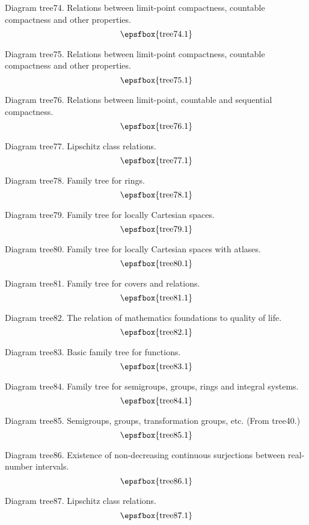 Diagram tree74. Relations between limit-point compactness, countable compactness
and other properties.
$$
\centerline{\epsfbox{tree74.1}}
$$

Diagram tree75. Relations between limit-point compactness, countable compactness
and other properties.
$$
\centerline{\epsfbox{tree75.1}}
$$

\filleject

Diagram tree76. Relations between limit-point, countable and sequential
compactness.
$$
\centerline{\epsfbox{tree76.1}}
$$

Diagram tree77. Lipschitz class relations.
$$
\centerline{\epsfbox{tree77.1}}
$$

Diagram tree78. Family tree for rings.
$$
\centerline{\epsfbox{tree78.1}}
$$

\filleject

Diagram tree79. Family tree for locally Cartesian spaces.
$$
\centerline{\epsfbox{tree79.1}}
$$

Diagram tree80. Family tree for locally Cartesian spaces with atlases.
$$
\centerline{\epsfbox{tree80.1}}
$$

Diagram tree81. Family tree for covers and relations.
$$
\centerline{\epsfbox{tree81.1}}
$$

Diagram tree82. The relation of mathematics foundations to quality of life.
$$
\centerline{\epsfbox{tree82.1}}
$$

Diagram tree83. Basic family tree for functions.
$$
\centerline{\epsfbox{tree83.1}}
$$

\filleject

Diagram tree84. Family tree for semigroups, groups, rings and integral systems.
$$
\centerline{\epsfbox{tree84.1}}
$$

Diagram tree85. Semigroups, groups, transformation groups, etc. (From tree40.)
$$
\centerline{\epsfbox{tree85.1}}
$$

Diagram tree86. Existence of non-decreasing continuous surjections between
real-number intervals.
$$
\centerline{\epsfbox{tree86.1}}
$$

Diagram tree87. Lipschitz class relations.
$$
\centerline{\epsfbox{tree87.1}}
$$

\filleject

